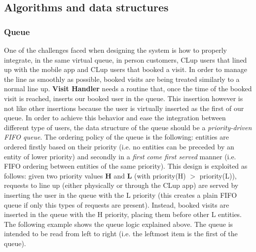 \documentclass[]{article}
\begin{document}
	
	\subsection{Algorithms and data structures}
	\subsubsection{Queue}
	One of the challenges faced when designing the system is how to properly integrate, in the same virtual queue, in person customers, CLup users that lined up with the mobile app and CLup users that booked a visit. \newline
	In order to manage the line as smoothly as possible, booked visits are being treated similarly to a normal line up. \newline
	\textbf{Visit Handler} needs a routine that, once the time of the booked visit is reached, inserts our booked user in the queue. \newline
	This insertion however is not like other insertions because the user is virtually inserted as the first of our queue.\newline \newline
	In order to achieve this behavior and ease the integration between different type of users, the data structure of the queue should be a  \textit{priority-driven FIFO queue}. \newline
	The ordering policy of the queue is the following: entities are ordered firstly based on their priority (i.e. no entities can be preceded by an entity of lower priority) and secondly in a \textit{first come first served} manner (i.e. FIFO ordering between entities of the same priority). \newline \newline
	This design is exploited as follows: given two priority values \textbf{H} and \textbf{L} (with priority(H) $>$ priority(L)), requests to line up (either physically or through the CLup app) are served by inserting the user in the queue with the L priority (this creates a plain FIFO queue if only this types of requests are present). \newline
	Instead, booked visits are inserted in the queue with the H priority, placing them before other L entities. \newline \newline
	The following example shows the queue logic explained above.\newline 
	The queue is intended to be read from left to right (i.e. the leftmost item is the first of the queue). \newline
	
\end{document}
